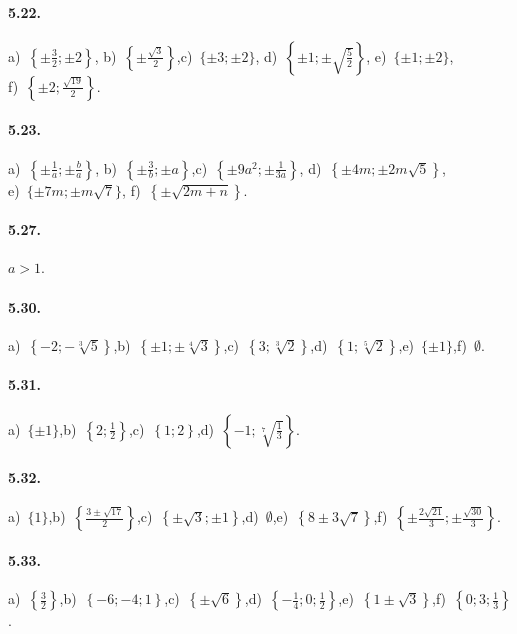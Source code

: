 \paragraph{5.22.} a)~$\left\{\pm \frac{3}{2}; \pm 2\right\}$, \quad b)~$\left\{\pm \frac{\sqrt 3} 2\right\}$,\quad c)~$\{\pm 3; \pm 2\}$, \quad d)~$\left\{\pm 1; \pm \sqrt{\frac{5}{2}}\right\}$, \quad e)~$\{\pm 1; \pm 2\}$, \protect\\
f)~$\left\{\pm 2; \frac{\sqrt {19}} 2\right\}$.

\paragraph{5.23.} a)~$\left\{\pm \frac{1}{a}; \pm \frac{b}{a}\right\}$, \quad b)~$\left\{\pm \frac{3}{b}; \pm a\right\}$,\quad c)~$\left\{\pm 9a^{2}; \pm \frac{1}{3a}\right\}$, \quad d)~$\left\{\pm 4m; \pm 2m\sqrt{5}\right\}$, \protect\\
e)~$\{\pm 7m; \pm m\sqrt{7}\}$, \quad f)~$\left\{\pm \sqrt{2m+n}\right\}$.

\paragraph{5.27.} $a>1$.

\paragraph{5.30.} a)~$\left\{-2;-\sqrt[3]5\right\}$,\quad b)~$\left\{\pm 1;\pm \sqrt[4]3\right\}$,\quad c)~$\left\{3;\sqrt[3]2\right\}$,\quad d)~$\left\{1;\sqrt[5]2\right\}$,\quad e)~$\{\pm 1\}$,\quad f)~$\emptyset $.

\paragraph{5.31.} a)~$\{\pm 1\}$,\quad b)~$\left\{2;\frac 1 2\right\}$,\quad c)~$\left\{1;2\right\}$,\quad d)~$\left\{-1;\sqrt[7]{\frac 1 3}\right\}$.

\paragraph{5.32.} a)~$\{1\}$,\quad b)~$\left\{\frac{3\pm\sqrt{17}} 2\right\}$,\quad c)~$\left\{\pm\sqrt 3;\pm 1\right\}$,\quad d)~$\emptyset $,\quad e)~$\left\{8\pm3\sqrt 7\right\}$,\quad f)~$\left\{\pm \frac{2\sqrt{21}} 3;\pm \frac{\sqrt{30}} 3\right\}$.

\paragraph{5.33.} a)~$\left\{\frac 3 2\right\}$,\quad b)~$\left\{-6;-4;1\right\}$,\quad c)~$\left\{\pm\sqrt 6\right\}$,\quad d)~$\left\{-\frac 1 4;0;\frac 1 2\right\}$,\quad e)~$\left\{1\pm \sqrt 3\right\}$,\quad f)~$\left\{0;3;\frac 1 3\right\}$.

